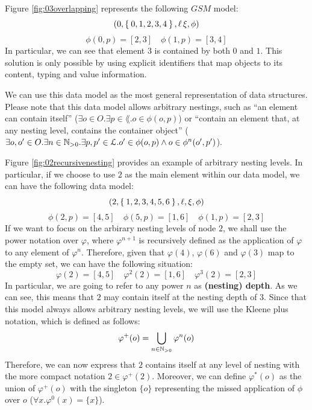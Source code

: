 \begin{example}[continues=ex:nineteedGSMfrst,label=ex:nineteedGSMsnd]
	Figure \vref{fig:03overlapping} represents the following $GSM$ model:
	\[(0,\Set{0,1,2,3,4},\ell\,\xi,\phi)\]
	\[\phi(0,p)=[2,3]\quad \phi(1,p)=[3,4]\]
	In particular, we can see that element $3$ is contained by both $0$ and $1$. This solution is only possible by using explicit identifiers that map objects to its content, typing and value information.
\end{example}

We can use this data model as the most general representation of data structures. Please note that this data model allows arbitrary nestings, such as ``an element can contain itself'' ($\exists o\in O.\exists p\in\lang. o\in \phi(o,p)$) or  ``contain an element that, at any nesting level, contains the container object'' ($\exists o,o'\in O.\exists n\in\nat_{>0}.\exists p,p'\in\lang. o'\in \phi(o,p)\wedge o\in \phi^n(o',p')$). 

\begin{example}[continues=ex:nineteedGSMsnd]
	Figure \vref{fig:02recursivenesting} provides an example of arbitrary nesting levels. In particular, if we choose to use $2$ as the main element within our data model, we can have the following data model:
	\[(2,\Set{1,2,3,4,5,6},\ell,\xi,\phi)\]
	\[\phi(2,p)=[4,5]\quad \phi(5,p)=[1,6]\quad \phi(1,p)=[2,3]\]
	If we want to focus on the arbirary nesting levels of node $2$, we shall use the power notation over $\varphi$, where $\varphi^{n+1}$ is recursively defined as the application of $\varphi$ to any element of $\varphi^n$. Therefore, given that $\varphi(4)$, $\varphi(6)$ and $\varphi(3)$ map to the empty set, we can have the following situation:
	\[\varphi(2)=[4,5]\quad \varphi^2(2)=[1,6]\quad \varphi^3(2)=[2,3]\]
	In particular, we are going to refer to any power $n$ as \textbf{(nesting) depth}. 
	As we can see, this means that $2$ may contain itself at the nesting depth of $3$. Since that this model always allows arbitrary nesting levels, we will use the Kleene plus notation, which is defined as follows:
	\[\varphi^+(o)=\bigcup_{n\in\mathbb{N}_{>0}}\varphi^n(o)\]
	Therefore, we can now express that $2$ contains itself at any level of nesting with the more compact notation $2\in\varphi^+(2)$. Moreover, we can define $\varphi^*(o)$ as the union of $\varphi^+(o)$ with the singleton $\{o\}$ representing the missed application of $\phi$ over $o$ ($\forall x.\varphi^0(x)=\{x\}$).
\end{example}



